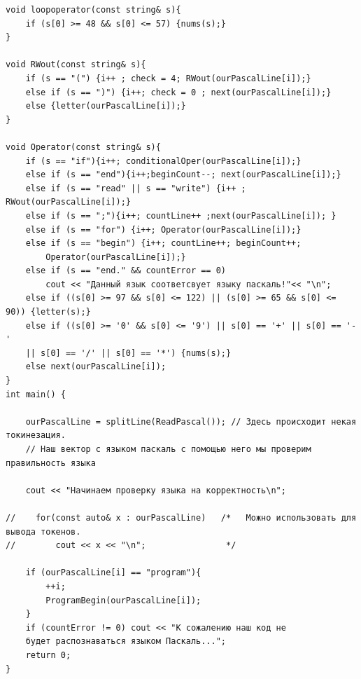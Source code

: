 \documentclass[12pt]{article}
\begin{document}
\begin{verbatim}
void loopoperator(const string& s){
    if (s[0] >= 48 && s[0] <= 57) {nums(s);}
}

void RWout(const string& s){
    if (s == "(") {i++ ; check = 4; RWout(ourPascalLine[i]);}
    else if (s == ")") {i++; check = 0 ; next(ourPascalLine[i]);}
    else {letter(ourPascalLine[i]);}
}

void Operator(const string& s){
    if (s == "if"){i++; conditionalOper(ourPascalLine[i]);}
    else if (s == "end"){i++;beginCount--; next(ourPascalLine[i]);}
    else if (s == "read" || s == "write") {i++ ; RWout(ourPascalLine[i]);}
    else if (s == ";"){i++; countLine++ ;next(ourPascalLine[i]); }
    else if (s == "for") {i++; Operator(ourPascalLine[i]);}
    else if (s == "begin") {i++; countLine++; beginCount++; 
        Operator(ourPascalLine[i]);}
    else if (s == "end." && countError == 0)
        cout << "Данный язык соответсвует языку паскаль!"<< "\n";
    else if ((s[0] >= 97 && s[0] <= 122) || (s[0] >= 65 && s[0] <= 90)) {letter(s);}
    else if ((s[0] >= '0' && s[0] <= '9') || s[0] == '+' || s[0] == '-' 
    || s[0] == '/' || s[0] == '*') {nums(s);}
    else next(ourPascalLine[i]);
}
int main() {

    ourPascalLine = splitLine(ReadPascal()); // Здесь происходит некая токинезация.
    // Наш вектор с языком паскаль с помощью него мы проверим правильность языка

    cout << "Начинаем проверку языка на корректность\n";

//    for(const auto& x : ourPascalLine)   /*   Можно использовать для вывода токенов.
//        cout << x << "\n";                */ 

    if (ourPascalLine[i] == "program"){
        ++i;
        ProgramBegin(ourPascalLine[i]);
    }
    if (countError != 0) cout << "К сожалению наш код не 
    будет распознаваться языком Паскаль...";
    return 0;
}

\end{verbatim}
\end{document}

